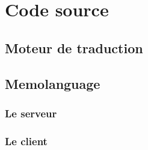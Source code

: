 \chapter{Code source}
\section{Moteur de traduction}
\section{Memolanguage}
    \subsection{Le serveur} %
%    
%
%

%
%
%
%
%
%
%

\subsection{Le client}
